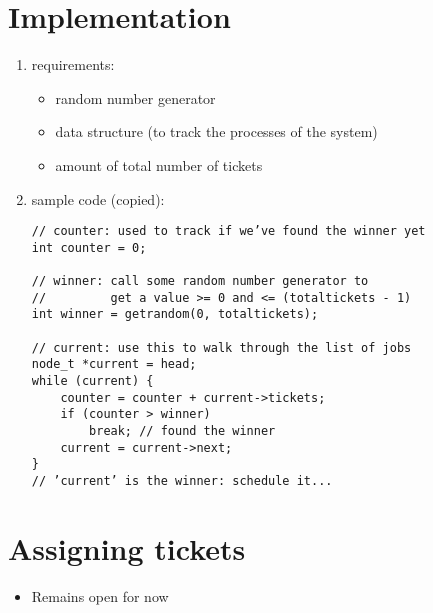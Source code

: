 \documentclass[11pt]{report}
\begin{document}
\section{Implementation}
\label{sec:org36bc201}
\begin{enumerate}
\item requirements:
\label{sec:orgf067f7d}
\begin{itemize}
\item random number generator
\item data structure (to track the processes of the system)
\item amount of total number of tickets
\end{itemize}
\item sample code (copied):
\label{sec:orgc4e4c39}
\begin{verbatim}
// counter: used to track if we’ve found the winner yet
int counter = 0;

// winner: call some random number generator to
//         get a value >= 0 and <= (totaltickets - 1)
int winner = getrandom(0, totaltickets);

// current: use this to walk through the list of jobs
node_t *current = head;
while (current) {
    counter = counter + current->tickets;
    if (counter > winner)
        break; // found the winner
    current = current->next;
}
// ’current’ is the winner: schedule it...
\end{verbatim}
\end{enumerate}
\section{Assigning tickets}
\label{sec:orga879a75}
\begin{itemize}
\item Remains open for now
\end{itemize}
\end{document}
